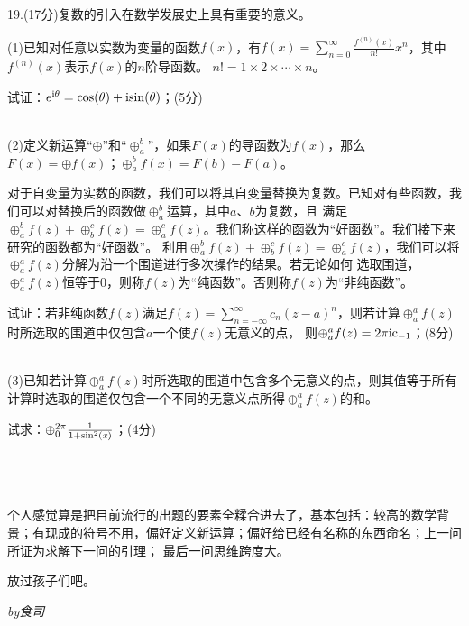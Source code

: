 \documentclass{ctexart}
\begin{document}
\pagestyle{empty}

19.\quad(17分)复数的引入在数学发展史上具有重要的意义。

(1)已知对任意以实数为变量的函数$f(x)$，有$f(x)=\sum_{n = 0}^{\infty} \frac{f^{(n)}(x)}{n!}x^n$，其中$f^{(n)}(x)$表示$f(x)$的$n$阶导函数。
$n!=1\times 2\times \cdots \times n$。

试证：$e^{\rm{i}\theta}=\rm{cos}(\theta)+\rm{isin}(\theta)$；(5分)

~\\

(2)定义新运算“$\oplus $”和“$\oplus _a^b$”，如果$F(x)$的导函数为$f(x)$，那么$F(x)=\oplus f(x)$；$\oplus _a^bf(x)=F(b)-F(a)$。

对于自变量为实数的函数，我们可以将其自变量替换为复数。已知对有些函数，我们可以对替换后的函数做$\oplus _a^b$运算，其中$a$、$b$为复数，且
满足$\oplus _a^bf(z)+\oplus _b^cf(z)=\oplus _a^cf(z)$。我们称这样的函数为“好函数”。我们接下来研究的函数都为“好函数”。
利用$\oplus _a^bf(z)+\oplus _b^cf(z)=\oplus _a^cf(z)$，我们可以将$\oplus _a^af(z)$分解为沿一个围道进行多次操作的结果。若无论如何
选取围道，$\oplus _a^af(z)$恒等于0，则称$f(z)$为“纯函数”。否则称$f(z)$为“非纯函数”。

试证：若非纯函数$f(z)$满足$f(z)=\sum_{n = -\infty}^{\infty} c_n(z-a)^n$，则若计算$\oplus _a^af(z)$时所选取的围道中仅包含$a$一个使$f(z)$无意义的点，
则$\oplus _a^af(z)=2\pi \rm{i}c_{-1}$；(8分)

~\\

(3)已知若计算$\oplus _a^af(z)$时所选取的围道中包含多个无意义的点，则其值等于所有计算时选取的围道仅包含一个不同的无意义点所得$\oplus _a^af(z)$的和。

试求：$\oplus _0^{2\pi}\frac{1}{1+\rm{sin}^2\it{(x)}}$；(4分)

~\\
~\\
~\\

个人感觉算是把目前流行的出题的要素全糅合进去了，基本包括：较高的数学背景；有现成的符号不用，偏好定义新运算；偏好给已经有名称的东西命名；上一问所证为求解下一问的引理；
最后一问思维跨度大。

放过孩子们吧。

\hfill\it{by}\rm{食司}

\hfill\zhtoday
\end{document}
